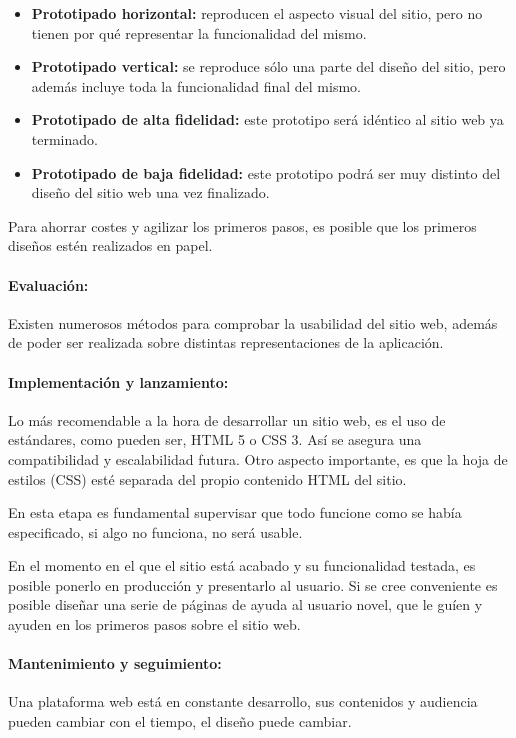 \begin{itemize}
	\item \textbf{Prototipado horizontal:} reproducen el aspecto visual del sitio, pero no tienen por qué representar la funcionalidad del mismo.
	\item \textbf{Prototipado vertical:} se reproduce sólo una parte del diseño del sitio, pero además incluye toda la funcionalidad final del mismo.
	\item \textbf{Prototipado de alta fidelidad:} este prototipo será idéntico al sitio web ya terminado.
	\item \textbf{Prototipado de baja fidelidad:} este prototipo podrá ser muy distinto del diseño del sitio web una vez finalizado.
\end{itemize}

Para ahorrar costes y agilizar los primeros pasos, es posible que los primeros diseños estén realizados en papel.

\paragraph{Evaluación:} Existen numerosos métodos para comprobar la usabilidad del sitio web, además de poder ser realizada sobre distintas representaciones de la aplicación.

\paragraph{Implementación y lanzamiento:} Lo más recomendable a la hora de desarrollar un sitio web, es el uso de estándares, como pueden ser, HTML 5 o CSS 3. Así se asegura una compatibilidad y escalabilidad futura. Otro aspecto importante, es que la hoja de estilos (CSS) esté separada del propio contenido HTML del sitio.

En esta etapa es fundamental supervisar que todo funcione como se había especificado, si algo no funciona, no será usable.

En el momento en el que el sitio está acabado y su funcionalidad testada, es posible ponerlo en producción y presentarlo al usuario. Si se cree conveniente es posible diseñar una serie de páginas de ayuda al usuario novel, que le guíen y ayuden en los primeros pasos sobre el sitio web.

\paragraph{Mantenimiento y seguimiento:} Una plataforma web está en constante desarrollo, sus contenidos y audiencia pueden cambiar con el tiempo, el diseño puede cambiar.

